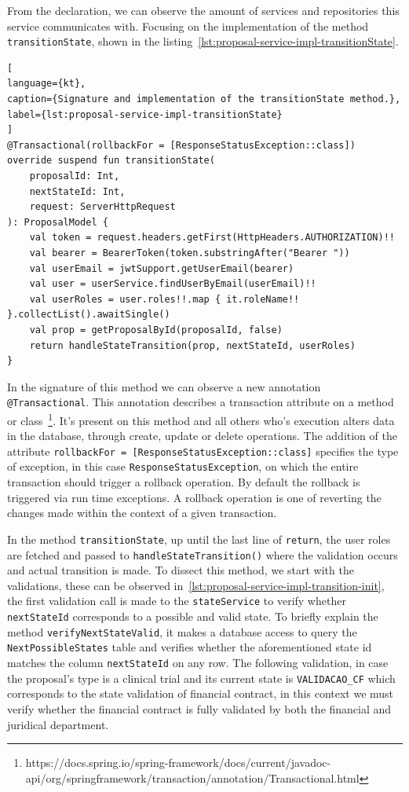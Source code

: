 From the declaration, we can observe the amount of services and repositories this service communicates with.
Focusing on the implementation of the method \lstinline{transitionState}, shown in the listing~\ref{lst:proposal-service-impl-transitionState}. 

\begin{lstlisting}[
language={kt},
caption={Signature and implementation of the transitionState method.},
label={lst:proposal-service-impl-transitionState}
]
@Transactional(rollbackFor = [ResponseStatusException::class])
override suspend fun transitionState(
    proposalId: Int,
    nextStateId: Int,
    request: ServerHttpRequest
): ProposalModel {
    val token = request.headers.getFirst(HttpHeaders.AUTHORIZATION)!!
    val bearer = BearerToken(token.substringAfter("Bearer "))
    val userEmail = jwtSupport.getUserEmail(bearer)
    val user = userService.findUserByEmail(userEmail)!!
    val userRoles = user.roles!!.map { it.roleName!! }.collectList().awaitSingle()
    val prop = getProposalById(proposalId, false)
    return handleStateTransition(prop, nextStateId, userRoles)
}    
\end{lstlisting}

In the signature of this method we can observe a new annotation \lstinline{@Transactional}. This annotation describes a transaction attribute on a method or class~\footnote{https://docs.spring.io/spring-framework/docs/current/javadoc-api/org/springframework/transaction/annotation/Transactional.html}\label{fn:spring-annotation-transactional}. 
It's present on this method and all others who's execution alters data in the database, through create, update or delete operations. The addition of the attribute \lstinline{rollbackFor = [ResponseStatusException::class]} specifies the type of exception, in this case \lstinline{ResponseStatusException}, on which the entire transaction should trigger a rollback operation. By default the rollback is triggered via run time exceptions. A rollback operation is one of reverting the changes made within the context of a given transaction.

In the method \lstinline{transitionState}, up until the last line of \lstinline{return}, the user roles are fetched and passed to \lstinline{handleStateTransition()} where the validation occurs and actual transition is made. 
To dissect this method, we start with the validations, these can be observed in~\ref{lst:proposal-service-impl-transition-init}, the first validation call is made to the \lstinline{stateService} to verify whether \lstinline{nextStateId} corresponds to a possible and valid state. To briefly explain the method \lstinline{verifyNextStateValid}, it makes a database access to query the \texttt{NextPossibleStates} table and verifies whether the aforementioned state id matches the column \lstinline{nextStateId} on any row.
The following validation, in case the proposal's type is a clinical trial and its current state is \lstinline{VALIDACAO_CF} which corresponds to the state validation of financial contract, in this context we must verify whether the financial contract is fully validated by both the financial and juridical department. 

